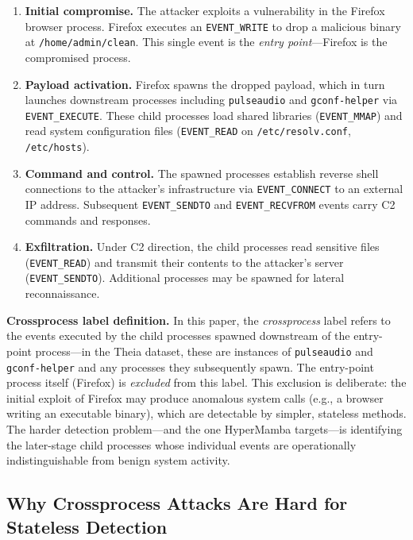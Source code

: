 \documentclass[letterpaper,twocolumn,10pt]{article}
\begin{document}
\begin{enumerate}
    \item \textbf{Initial compromise.} The attacker exploits a vulnerability in the Firefox browser process. Firefox executes an \texttt{EVENT\_WRITE} to drop a malicious binary at \texttt{/home/admin/clean}. This single event is the \emph{entry point}---Firefox is the compromised process.

    \item \textbf{Payload activation.} Firefox spawns the dropped payload, which in turn launches downstream processes including \texttt{pulseaudio} and \texttt{gconf-helper} via \texttt{EVENT\_EXECUTE}. These child processes load shared libraries (\texttt{EVENT\_MMAP}) and read system configuration files (\texttt{EVENT\_READ} on \texttt{/etc/resolv.conf}, \texttt{/etc/hosts}).

    \item \textbf{Command and control.} The spawned processes establish reverse shell connections to the attacker's infrastructure via \texttt{EVENT\_CONNECT} to an external IP address. Subsequent \texttt{EVENT\_SENDTO} and \texttt{EVENT\_RECVFROM} events carry C2 commands and responses.

    \item \textbf{Exfiltration.} Under C2 direction, the child processes read sensitive files (\texttt{EVENT\_READ}) and transmit their contents to the attacker's server (\texttt{EVENT\_SENDTO}). Additional processes may be spawned for lateral reconnaissance.
\end{enumerate}

\textbf{Crossprocess label definition.} In this paper, the \emph{crossprocess} label refers to the events executed by the child processes spawned downstream of the entry-point process---in the Theia dataset, these are instances of \texttt{pulseaudio} and \texttt{gconf-helper} and any processes they subsequently spawn. The entry-point process itself (Firefox) is \emph{excluded} from this label. This exclusion is deliberate: the initial exploit of Firefox may produce anomalous system calls (e.g., a browser writing an executable binary), which are detectable by simpler, stateless methods. The harder detection problem---and the one HyperMamba targets---is identifying the later-stage child processes whose individual events are operationally indistinguishable from benign system activity.

\subsection{Why Crossprocess Attacks Are Hard for Stateless Detection}
\label{sec:crossprocess_hard}
\end{document}
